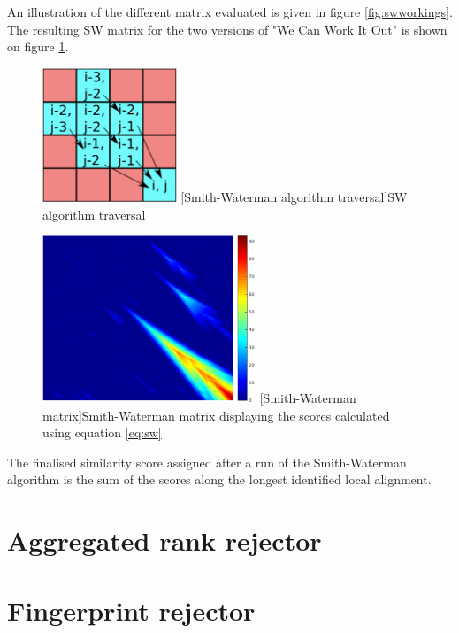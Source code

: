 An illustration of the different matrix evaluated is given in figure
\ref{fig:swworkings}. The resulting SW matrix for the two versions of "We Can
Work It Out" is shown on figure \ref{fig:swmatrix}.
\begin{figure}[H]
    \centering
    \begin{minipage}{.5\textwidth}
      \centering
      \includegraphics[height=4cm, keepaspectratio]{Algorithms/swworkings.png}
      [Smith-Waterman algorithm traversal]{SW algorithm traversal}
      \label{fig:swworkings}
    \end{minipage}%
    \begin{minipage}{.5\textwidth}
      \centering
      \includegraphics[height=5cm, keepaspectratio]{Algorithms/swmatrix.png}
      [Smith-Waterman matrix]{Smith-Waterman matrix displaying the scores calculated using equation \ref{eq:sw}}
      \label{fig:swmatrix}
    \end{minipage}
 \end{figure}

The finalised similarity score assigned after a run of the Smith-Waterman
algorithm is the sum of the scores along the longest identified local alignment.

\section{Aggregated rank rejector} 
\label{sec:timbre}
\section{Fingerprint rejector} 
\label{sec:rankaggregation}


